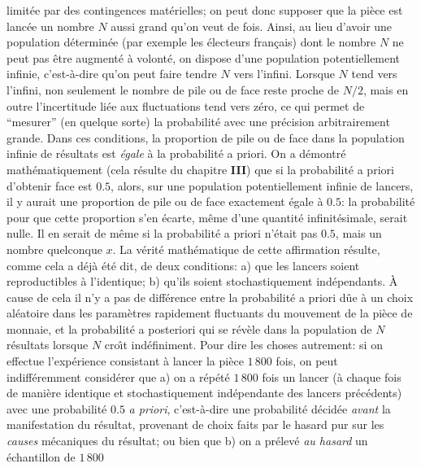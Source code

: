 limit\'ee par des contingences mat\'erielles;  on peut donc supposer que 
la pi\`ece est lanc\'ee un nombre $N$ aussi grand qu'on veut de fois. 
Ainsi,  au lieu d'avoir une population d\'etermin\'ee (par exemple les 
\'electeurs fran\c{c}ais) dont le nombre $N$ ne peut pas \^etre 
augment\'e \`a volont\'e,  on dispose d'une population potentiellement 
infinie, c'est-\`a-dire qu'on peut faire tendre $N$ vers l'infini. Lorsque 
$N$ tend vers l'infini, non seulement le nombre de pile ou de face reste 
proche de $N/2$, mais en outre l'incertitude li\'ee aux fluctuations 
tend vers z\'ero, ce qui permet de ``mesurer'' (en quelque sorte) la 
probabilit\'e avec une pr\'ecision arbitrairement grande. 
 \medskip 
Dans ces conditions,  la proportion de pile ou de face dans la population 
infinie de r\'esultats est {\it \'egale} \`a la probabilit\'e a priori. On a
d\'emontr\'e math\'ematiquement (cela r\'esulte du chapitre {\bf III})
que si la probabilit\'e a priori d'obtenir face est $0.5$, alors, sur une 
population potentiellement infinie de lancers, il y aurait une proportion 
de pile ou de face exactement \'egale \`a $0.5$: la probabilit\'e pour que 
cette proportion s'en \'ecarte, m\^eme d'une quantit\'e infinit\'esimale, 
serait nulle.  Il en serait de m\^eme si la probabilit\'e a priori n'\'etait
pas $0.5$,  mais un nombre quelconque $x$.  La v\'erit\'e math\'ematique 
de cette affirmation r\'esulte,  comme cela a d\'ej\`a \'et\'e dit,  de deux 
conditions: 
\smallskip 
a) que les lancers soient reproductibles \`a l'identique; 
\smallskip 
b) qu'ils soient stochastiquement ind\'ependants. 
\medskip 
\`A cause de cela il n'y a 
pas de diff\'erence entre la probabilit\'e a priori d\^ue \`a un choix 
al\'eatoire dans les param\`etres rapidement fluctuants du mouvement 
de la pi\`ece de monnaie, et la probabilit\'e a posteriori qui se
r\'ev\`ele dans la population de $N$ r\'esultats lorsque $N$ cro{\^\i}t 
ind\'efiniment.  Pour dire les choses autrement:  si on effectue
l'exp\'erience consistant \`a lancer la pi\`ece $1\, 800$ fois,  on
peut indiff\'eremment consid\'erer que
\smallskip 
a) on a r\'ep\'et\'e $1\, 800$ fois un lancer (\`a chaque fois de
mani\`ere identique et stochastiquement ind\'ependante des lancers 
pr\'ec\'edents) avec une probabilit\'e $0.5$ {\it a priori},  c'est-\`a-dire 
une probabilit\'e d\'ecid\'ee {\it avant} la manifestation du r\'esultat, 
provenant de choix faits par le hasard pur sur les {\it causes} 
m\'ecaniques du r\'esultat; 
\smallskip 
\noindent ou bien que 
\smallskip 
b) on a pr\'elev\'e {\it au hasard} un \'echantillon de $1\, 800$
